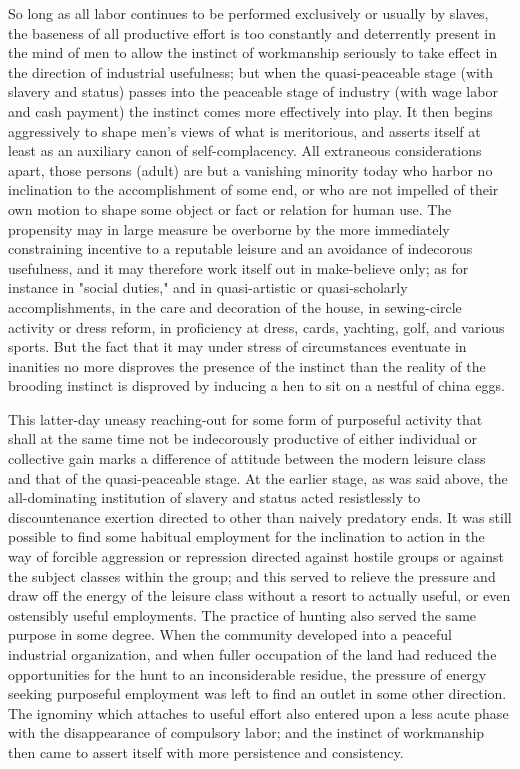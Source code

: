 \documentclass[12pt]{report}
\begin{document}
So long as all labor continues to be performed exclusively or usually
by slaves, the baseness of all productive effort is too constantly
and deterrently present in the mind of men to allow the instinct of
workmanship seriously to take effect in the direction of industrial
usefulness; but when the quasi-peaceable stage (with slavery and status)
passes into the peaceable stage of industry (with wage labor and cash
payment) the instinct comes more effectively into play. It then begins
aggressively to shape men's views of what is meritorious, and asserts
itself at least as an auxiliary canon of self-complacency. All
extraneous considerations apart, those persons (adult) are but a
vanishing minority today who harbor no inclination to the accomplishment
of some end, or who are not impelled of their own motion to shape some
object or fact or relation for human use. The propensity may in large
measure be overborne by the more immediately constraining incentive to a
reputable leisure and an avoidance of indecorous usefulness, and it
may therefore work itself out in make-believe only; as for instance
in "social duties," and in quasi-artistic or quasi-scholarly
accomplishments, in the care and decoration of the house, in
sewing-circle activity or dress reform, in proficiency at dress, cards,
yachting, golf, and various sports. But the fact that it may under
stress of circumstances eventuate in inanities no more disproves the
presence of the instinct than the reality of the brooding instinct is
disproved by inducing a hen to sit on a nestful of china eggs.

This latter-day uneasy reaching-out for some form of purposeful activity
that shall at the same time not be indecorously productive of either
individual or collective gain marks a difference of attitude between
the modern leisure class and that of the quasi-peaceable stage. At the
earlier stage, as was said above, the all-dominating institution
of slavery and status acted resistlessly to discountenance exertion
directed to other than naively predatory ends. It was still possible to
find some habitual employment for the inclination to action in the way
of forcible aggression or repression directed against hostile groups or
against the subject classes within the group; and this served to relieve
the pressure and draw off the energy of the leisure class without a
resort to actually useful, or even ostensibly useful employments. The
practice of hunting also served the same purpose in some degree. When the
community developed into a peaceful industrial organization, and when
fuller occupation of the land had reduced the opportunities for the hunt
to an inconsiderable residue, the pressure of energy seeking purposeful
employment was left to find an outlet in some other direction. The
ignominy which attaches to useful effort also entered upon a less acute
phase with the disappearance of compulsory labor; and the instinct
of workmanship then came to assert itself with more persistence and
consistency.
\end{document}
